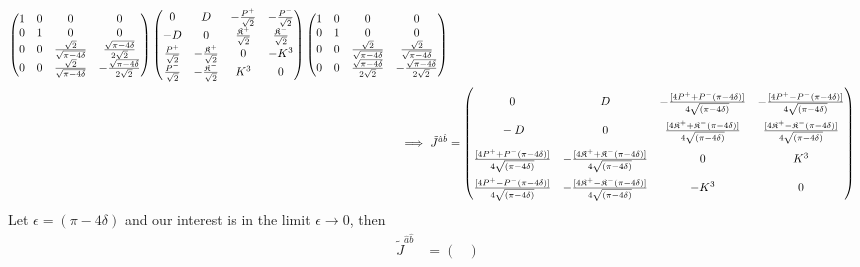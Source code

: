 \documentclass[]{article}
\numberwithin{equation}{section}
\begin{document}
{{\begin{align}
\begin{pmatrix}
    1&0&0&0\\
    0&1&0&0\\
    0&0&\frac{\sqrt{2}}{\sqrt{\pi-4\delta}} & \frac{\sqrt{\pi-4\delta}}{2\sqrt{2}}\\
    0&0&\frac{\sqrt{2}}{\sqrt{\pi-4\delta}} & -\frac{\sqrt{\pi-4\delta}}{2\sqrt{2}}
    \end{pmatrix}\begin{pmatrix}
     0&D&-\frac{P^{{+}}}{\sqrt{2}}&-\frac{P^{{-}}}{\sqrt{2}}\\
     -D&0&\frac{\mathfrak{K}^{{+}}}{\sqrt{2}}&\frac{\mathfrak{K}^{{-}}}{\sqrt{2}}\\
     \frac{P^{{+}}}{\sqrt{2}}&-\frac{\mathfrak{K}^{{+}}}{\sqrt{2}}&0  & -K^3\\
     \frac{P^{{-}}}{\sqrt{2}}&-\frac{\mathfrak{K}^{{-}}}{\sqrt{2}}&K^3  & 0
  \end{pmatrix}\begin{pmatrix}
    1&0&0&0\\
    0&1&0&0\\
    0&0&\frac{\sqrt{2}}{\sqrt{\pi-4\delta}}  & \frac{\sqrt{2}}{\sqrt{\pi-4\delta}}\\
    0&0&\frac{\sqrt{\pi-4\delta}}{2\sqrt{2}}  & -\frac{\sqrt{\pi-4\delta}}{2\sqrt{2}}
    \end{pmatrix}\\
    \Longrightarrow~\tilde{J}^{{\hat{a}}{\hat{b}}}&=\begin{pmatrix}
    \rule{0pt}{16pt} 0&D&-\frac{[4P^{{+}}+P^{-}(\pi-4\delta)]}{4\sqrt{(\pi-4\delta)}}&-\frac{[4P^{{+}}-P^{-}(\pi-4\delta)]}{4\sqrt{(\pi-4\delta)}}\\
    \rule{0pt}{16pt} -D&0&\frac{[4\mathfrak{K}^{+}+\mathfrak{K}^{-}(\pi-4\delta)]}{4\sqrt{(\pi-4\delta)}}&\frac{[4\mathfrak{K}^{+}-\mathfrak{K}^{-}(\pi-4\delta)]}{4\sqrt{(\pi-4\delta)}}\\
    \rule{0pt}{16pt} \frac{[4P^{{+}}+P^{-}(\pi-4\delta)]}{4\sqrt{(\pi-4\delta)}}&-\frac{[4\mathfrak{K}^{+}+\mathfrak{K}^{-}(\pi-4\delta)]}{4\sqrt{(\pi-4\delta)}}&0  & K^3\\
    \rule{0pt}{16pt}\frac{[4P^{{+}}-P^{-}(\pi-4\delta)]}{4\sqrt{(\pi-4\delta)}}&-\frac{[4\mathfrak{K}^{+}-\mathfrak{K}^{-}(\pi-4\delta)]}{4\sqrt{(\pi-4\delta)}}&-K^3  & 0
  \end{pmatrix}
  \end{align}
Let $\epsilon=(\pi-4\delta)$ and our interest is in the limit $\epsilon\rightarrow0$, then
\begin{align}
    \tilde{J}^{{\hat{a}}{\hat{b}}}&=\begin{pmatrix}

\end{pmatrix}
\end{align}}}
\end{document}
